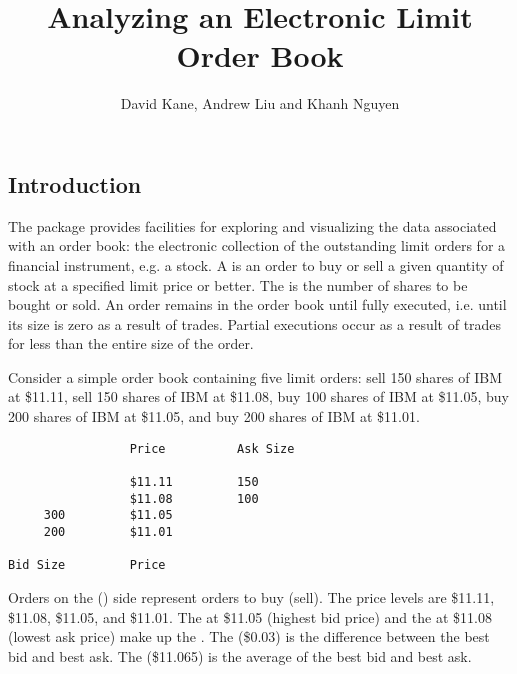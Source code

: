 \documentclass[a4paper]{report}
\begin{document}
\begin{article}

\title{Analyzing an Electronic Limit Order Book}
\author{David Kane, Andrew Liu and Khanh Nguyen}


\maketitle



\section{Introduction}

The  package provides facilities for exploring and
visualizing the data associated with an order book: the electronic
collection of the outstanding limit orders for a financial instrument,
e.g. a stock. A  is an order to buy or sell a given
quantity of stock at a specified limit price or better. The
 is the number of shares to be bought or sold.  An order
remains in the order book until fully executed, i.e. until its size is
zero as a result of trades. Partial executions occur as a result of
trades for less than the entire size of the order.

Consider a simple order book containing five limit orders: sell 150
shares of IBM at \$11.11, sell 150 shares of IBM at \$11.08, buy 100
shares of IBM at \$11.05, buy 200 shares of IBM at \$11.05, and buy
200 shares of IBM at \$11.01.

\begin{verbatim}
                 Price          Ask Size

                 $11.11         150
                 $11.08         100
     300         $11.05
     200         $11.01

Bid Size         Price
\end{verbatim}

\noindent Orders on the  () side represent orders to buy
(sell). The price levels are \$11.11, \$11.08, \$11.05, and
\$11.01. The  at \$11.05 (highest bid price) and the
 at \$11.08 (lowest ask price) make up the . The  (\$0.03) is the difference between the
best bid and best ask. The  (\$11.065) is the average
of the best bid and best ask.


\end{article}
\end{document}
